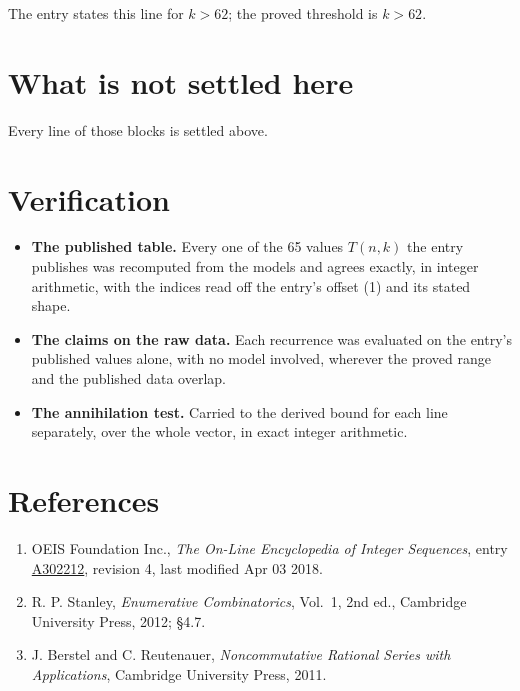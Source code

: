 \documentclass[11pt]{article}
\theoremstyle{definition}
\begin{document}
The entry states this line for $k > 62$; the proved threshold is $k > 62$.

\section{What is not settled here}

Every line of those blocks is settled above.

\section{Verification}

\begin{itemize}

\item {\bfseries The published table.} Every one of the 65 values $T(n,k)$ the entry publishes was recomputed from the models and agrees exactly, in integer arithmetic, with the indices read off the entry's offset (1) and its stated shape.

\item {\bfseries The claims on the raw data.} Each recurrence was evaluated on the entry's published values alone, with no model involved, wherever the proved range and the published data overlap.

\item {\bfseries The annihilation test.} Carried to the derived bound for each line separately, over the whole vector, in exact integer arithmetic.

\end{itemize}

\section{References}

\begin{enumerate}

\item OEIS Foundation Inc., \emph{The On-Line Encyclopedia of Integer Sequences}, entry \href{https://oeis.org/A302212}{A302212}, revision 4, last modified Apr 03 2018.

\item R. P. Stanley, \emph{Enumerative Combinatorics}, Vol.~1, 2nd ed., Cambridge University Press, 2012; \S4.7.

\item J. Berstel and C. Reutenauer, \emph{Noncommutative Rational Series with Applications}, Cambridge University Press, 2011.

\end{enumerate}
\end{document}
